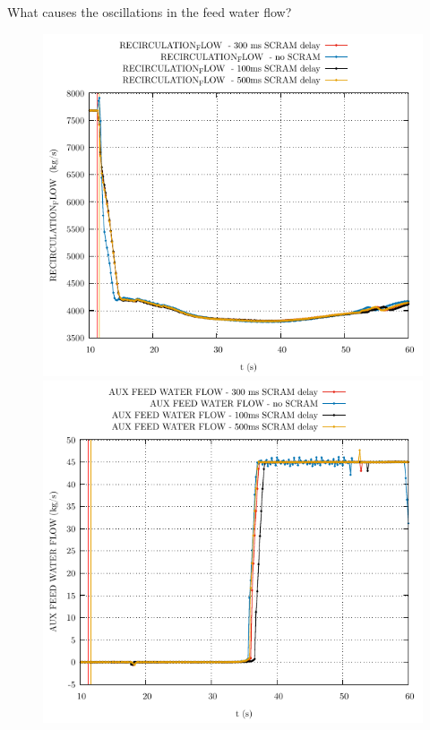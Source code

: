 \begin{frame}{What causes the oscillations in the feed water flow?}
\begin{figure}
\begin{minipage}{.5\textwidth}
			\centering
			\includegraphics[width=0.7\linewidth]{./graphs/RECIRCULATION_FLOW _comp.pdf}
		\end{minipage}%
		\begin{minipage}{.5\textwidth}
			
			
			\centering
			\includegraphics[width=.7\linewidth]{./graphs/AUX FEED WATER FLOW_comp.pdf}
		\end{minipage}
	\end{figure}
\end{frame}
%		
%
%		





